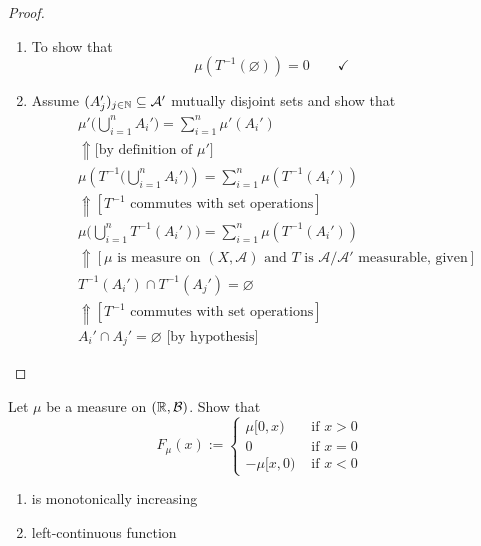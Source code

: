 \begin{proof}

\begin{enumerate}
  \item To show that
\[
\mu (T^{-1}(\varnothing ))=0 \qquad \checkmark
\]
  \item Assume \((A_{j}')_{j\in \Bbb{N}}\subseteq \mathcal{A}'\) mutually disjoint sets and show that
\begin{align*}
&\mu '\Big(\bigcup _{i=1}^nA_{i}'\Big)=\sum _{i=1}^n\mu '(A_{i}') \\
&\Uparrow  \text{[by definition of $\mu '$]}\\
&\mu (T^{-1}\Big(\bigcup _{i=1}^nA_{i}'\Big))=\sum _{i=1}^n\mu (T^{-1}(A_{i}'))\\
&\Uparrow [\text{$T^{-1}$ commutes with set operations}] \\
&\mu \Big(\bigcup _{i=1}^nT^{-1}(A_{i}')\Big)=\sum _{i=1}^n\mu (T^{-1}(A_{i}')) \\
&\Uparrow [\text{$\mu $ is measure on $(X,\mathcal{A})$ and $T$ is $\mathcal{A}/\mathcal{A}'$ measurable, given}] \\
&T^{-1}(A_{i}') \cap  T^{-1}(A_{j}')=\varnothing  \\
&\Uparrow [T^{-1} \text{ commutes with set operations}] \\
&A_{i}'\cap A_{j}'=\varnothing  \text{  [by hypothesis]}
\end{align*}
\end{enumerate}

\end{proof}
\begin{thm}[Problem 7.9i]
Let \(\mu \) be a measure on \((\Bbb{R},\mathcal{B})\). Show that
\[
F_\mu (x):=\begin{cases}\mu [0,x) &\text{ if }x>0 \\0 & \text{ if }x=0 \\ -\mu [x,0) &\text{ if }x<0\end{cases}
\]

\begin{enumerate}
  \item is monotonically increasing
  \item left-continuous function
\end{enumerate}
\end{thm}


